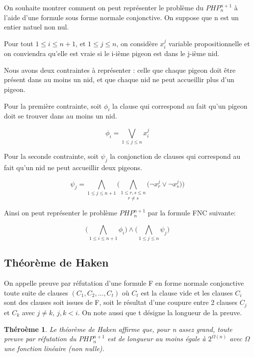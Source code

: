 \documentclass[12pt]{extarticle}
\newtheorem{mytheorem}{Théroème}
\begin{document}
\vspace{2em}

On souhaite montrer comment on peut représenter le problème du $PHP_n^{n + 1}$ à l'aide d'une formule sous forme normale conjonctive. On suppose que n est un entier natuel non nul.

Pour tout $1 \leq i \leq n + 1$, et $1 \leq j \leq n$, on considère $x_i^j$ variable propositionnelle et on conviendra qu'elle est vraie si le i-ième pigeon est dans le j-ième nid.

Nous avons deux contraintes à représenter : celle que chaque pigeon doit être présent dans au moins un nid, et que chaque nid ne peut accueillir plus d'un pigeon.

Pour la première contrainte, soit $\phi_i$ la clause qui correspond au fait qu'un pigeon doit se trouver dans au moins un nid.

$$ \phi_i = \bigvee_{1 \leq j \leq n} x_i^j $$

Pour la seconde contrainte, soit $\psi_j$ la conjonction de clauses qui correspond au fait qu'un nid ne peut accueillir deux pigeons.

$$ \psi_j = \bigwedge_{1 \leq j \leq n + 1} \Big( \underset{r \neq s}{\bigwedge_{1 \leq r, s \leq n}} \big( \lnot{x_r^j} \lor \lnot{x_s^j} \big) \Big) $$

Ainsi on peut représenter le problème $PHP_n^{n + 1}$ par la formule FNC suivante:

$$\Big( \bigwedge_{1 \leq i \leq n + 1} \phi_i \Big) \land \Big( \bigwedge_{1 \leq j \leq n} \psi_j \Big)$$

\subsection{Théorème de Haken}

On appelle preuve par réfutation d'une formule F en forme normale conjonctive toute suite de clauses $(C_1, C_2, ..., C_t)$ où $C_t$ est la clause vide et les clauses $C_i$ sont des clauses soit issues de F, soit le résultat d'une coupure entre 2 clauses $C_j$ et $C_k$ avec $j \neq k$, $j, k < i$. On note aussi que t désigne la longueur de la preuve.

\begin{mytheorem}
Le théorème de Haken affirme que, pour n assez grand, toute preuve par réfutation du $PHP_n^{n + 1}$ est de longueur au moins égale à $2^{\Omega(n)}$ avec $\Omega$ une fonction linéaire (non nulle).
\end{mytheorem}
\end{document}
